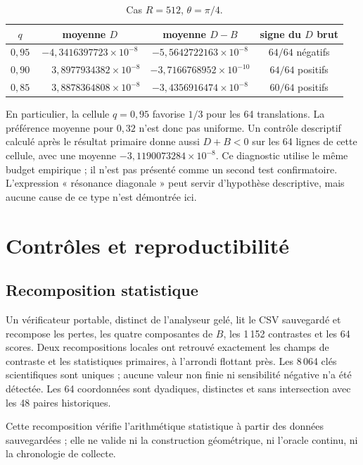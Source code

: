 \documentclass[11pt,a4paper]{article}
\begin{document}
\begin{table}[htbp]
\centering
\caption{Cas $R=512$, $\theta=\pi/4$.}
\label{tab:pi4}
\begin{tabular}{@{}cccc@{}}
\toprule
$q$ & moyenne $D$ & moyenne $D-B$ & signe du $D$ brut \\
\midrule
$0{,}95$ & $-4{,}3416397723\times10^{-8}$ & $-5{,}5642722163\times10^{-8}$ & $64/64$ négatifs \\
$0{,}90$ & $\phantom{-}3{,}8977934382\times10^{-8}$ & $-3{,}7166768952\times10^{-10}$ & $64/64$ positifs \\
$0{,}85$ & $\phantom{-}3{,}8878364808\times10^{-8}$ & $-3{,}4356916474\times10^{-8}$ & $60/64$ positifs \\
\bottomrule
\end{tabular}
\end{table}

En particulier, la cellule $q=0{,}95$ favorise $1/3$ pour les 64 translations. La préférence moyenne pour $0{,}32$ n'est donc pas uniforme. Un contrôle descriptif calculé après le résultat primaire donne aussi $D+B<0$ sur les 64 lignes de cette cellule, avec une moyenne $-3{,}1190073284\times10^{-8}$. Ce diagnostic utilise le même budget empirique ; il n'est pas présenté comme un second test confirmatoire. L'expression « résonance diagonale » peut servir d'hypothèse descriptive, mais aucune cause de ce type n'est démontrée ici.

\section{Contrôles et reproductibilité}

\subsection{Recomposition statistique}

Un vérificateur portable, distinct de l'analyseur gelé, lit le CSV sauvegardé et recompose les pertes, les quatre composantes de $B$, les 1\,152 contrastes et les 64 scores. Deux recompositions locales ont retrouvé exactement les champs de contraste et les statistiques primaires, à l'arrondi flottant près. Les 8\,064 clés scientifiques sont uniques ; aucune valeur non finie ni sensibilité négative n'a été détectée. Les 64 coordonnées sont dyadiques, distinctes et sans intersection avec les 48 paires historiques.

Cette recomposition vérifie l'arithmétique statistique à partir des données sauvegardées ; elle ne valide ni la construction géométrique, ni l'oracle continu, ni la chronologie de collecte.
\end{document}
